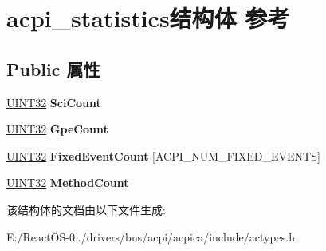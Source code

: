 \hypertarget{structacpi__statistics}{}\section{acpi\+\_\+statistics结构体 参考}
\label{structacpi__statistics}
\subsection*{Public 属性}
\begin{DoxyCompactItemize}
\item 
\mbox{\label{structacpi__statistics_a4943b86f8752920f4bae58059bc6c04a}} 
\hyperlink{_processor_bind_8h_ae1e6edbbc26d6fbc71a90190d0266018}{U\+I\+N\+T32} {\bfseries Sci\+Count}
\item 
\mbox{\label{structacpi__statistics_af4c0ff45410b28ea9dc6417fbd06bed1}} 
\hyperlink{_processor_bind_8h_ae1e6edbbc26d6fbc71a90190d0266018}{U\+I\+N\+T32} {\bfseries Gpe\+Count}
\item 
\mbox{\label{structacpi__statistics_a0df86f115592621918224e66ccaaa59c}} 
\hyperlink{_processor_bind_8h_ae1e6edbbc26d6fbc71a90190d0266018}{U\+I\+N\+T32} {\bfseries Fixed\+Event\+Count} \mbox{[}A\+C\+P\+I\+\_\+\+N\+U\+M\+\_\+\+F\+I\+X\+E\+D\+\_\+\+E\+V\+E\+N\+TS\mbox{]}
\item 
\mbox{\label{structacpi__statistics_a8faed1d677736b72d1272afa2ff0c3df}} 
\hyperlink{_processor_bind_8h_ae1e6edbbc26d6fbc71a90190d0266018}{U\+I\+N\+T32} {\bfseries Method\+Count}
\end{DoxyCompactItemize}


该结构体的文档由以下文件生成\+:\begin{DoxyCompactItemize}
\item 
E\+:/\+React\+O\+S-\/0../drivers/bus/acpi/acpica/include/actypes.\+h\end{DoxyCompactItemize}
